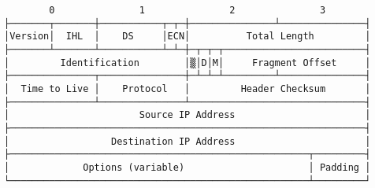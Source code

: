 \documentclass[varwidth=25cm,crop]{standalone}
\begin{document}
\begin{verbatim}
        0               1               2               3
├───────┬───────┼───────────┬─┬─┼───────────────┴───────────────┤
│Version│  IHL  │    DS     │ECN│          Total Length         │
├───────┴───────┴───────────┴─┴─┼─┬─┬─┬─────────────────────────┤
│         Identification        │▒│D│M│     Fragment Offset     │
├───────────────┬───────────────┼─┴─┴─┴─────────┴───────────────┤
│  Time to Live │    Protocol   │         Header Checksum       │
├───────────────┴───────────────┴───────────────────────────────┤
│                       Source IP Address                       │
├───────────────────────────────────────────────────────────────┤
│                  Destination IP Address                       │
├─────────────────────────────────────────────────────┬─────────┤
│             Options (variable)                      │ Padding │
└─────────────────────────────────────────────────────┴─────────┘
\end{verbatim}
\end{document}
